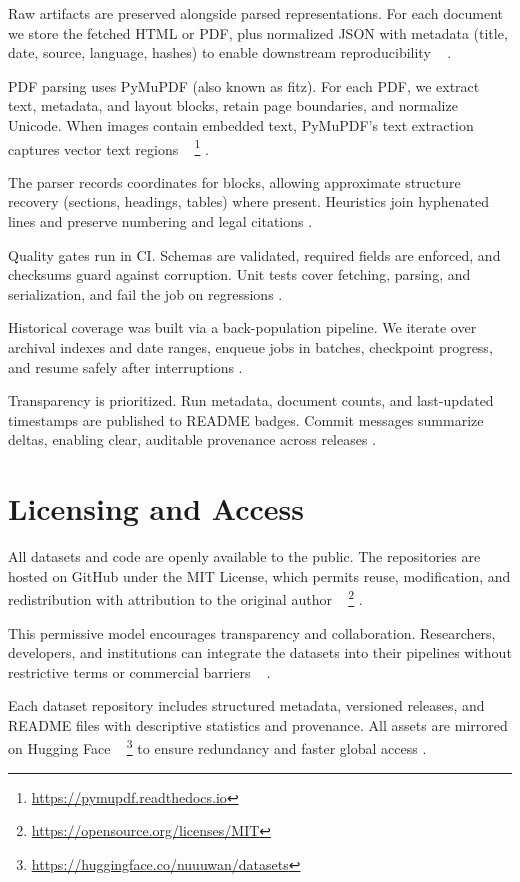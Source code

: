 \documentclass[10pt,a4paper]{article}%
\begin{document}
%
Raw artifacts are preserved alongside parsed
 representations. For each document we store
 the fetched HTML or PDF, plus normalized JSON
 with metadata (title, date, source, language,
 hashes) to enable downstream reproducibility%
~%
\citep{DataVersioning2020}%
.%

%
PDF parsing uses PyMuPDF (also known as fitz). For each PDF,
 we extract text, metadata, and layout blocks,
 retain page boundaries, and normalize Unicode.
 When images contain embedded text, PyMuPDF’s
 text extraction captures vector text regions%
~%
\footnote{\href{https://pymupdf.readthedocs.io}{https://pymupdf.readthedocs.io}}%
.%

%
The parser records coordinates for blocks, allowing approximate structure recovery (sections, headings, tables) where present. Heuristics join hyphenated lines and preserve numbering and legal citations .%

%
Quality gates run in CI. Schemas are validated, required fields are enforced, and checksums guard against corruption. Unit tests cover fetching, parsing, and serialization, and fail the job on regressions .%

%
Historical coverage was built via a back-population pipeline. We iterate over archival indexes and date ranges, enqueue jobs in batches, checkpoint progress, and resume safely after interruptions .%

%
Transparency is prioritized. Run metadata, document counts, and last-updated timestamps are published to README badges. Commit messages summarize deltas, enabling clear, auditable provenance across releases .%

%
\section{Licensing and Access}%
\label{sec:LicensingandAccess}%
All datasets and code are openly available to
 the public. The repositories are hosted on
 GitHub under the MIT License, which permits
 reuse, modification, and redistribution with
 attribution to the original author%
~%
\footnote{\href{https://opensource.org/licenses/MIT}{https://opensource.org/licenses/MIT}}%
.%

%
This permissive model encourages transparency
 and collaboration. Researchers, developers, and
 institutions can integrate the datasets into
 their pipelines without restrictive terms or
 commercial barriers%
~%
\citep{OpenDataPractices2020}%
.%

%
Each dataset repository includes structured
 metadata, versioned releases, and README files
 with descriptive statistics and provenance.
 All assets are mirrored on Hugging Face%
~%
\footnote{\href{https://huggingface.co/nuuuwan/datasets}{https://huggingface.co/nuuuwan/datasets}}%
to ensure redundancy and faster global access .%
\end{document}
